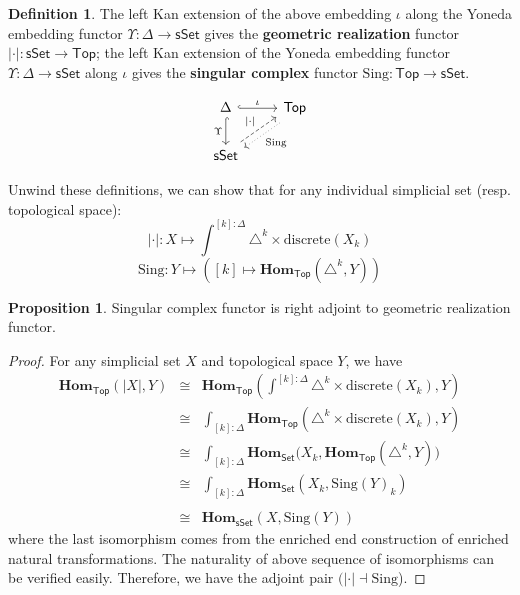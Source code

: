 \documentclass{article}
\theoremstyle{definition}
\newtheorem{mydef}{Definition}[section]
\newtheorem{prop}{Proposition}[section]
\theoremstyle{remark}
\begin{document}
\begin{mydef}

The left Kan extension of the above embedding $\iota$ along the Yoneda embedding functor $\Upsilon: \Delta \to \mathsf{sSet}$ gives the \textbf{geometric realization} functor $|\cdot|: \mathsf{sSet} \to \mathsf{Top}$; the left Kan extension of the Yoneda embedding functor $\Upsilon: \Delta \to \mathsf{sSet}$ along $\iota$ gives the \textbf{singular complex} functor $\mathrm{Sing}: \mathsf{Top} \to \mathsf{sSet}$.

$$\begin{tikzcd} \Delta \arrow[d, "\Upsilon"', hook] \arrow[r, "\iota", hook] & \mathsf{Top} \arrow[ld, "\mathrm{Sing}", dotted, shift left] \\
\mathsf{sSet} \arrow[ru, "|\cdot|", dashed, shift left]               &                                         
\end{tikzcd}$$

Unwind these definitions, we can show that for any individual simplicial set (resp. topological space): $$ |\cdot|:X \mapsto \int^{[k]:\Delta}{\triangle^k \times \mathrm{discrete}(X_k) }$$    $$ \mathrm{Sing}: Y \mapsto ([k] \mapsto \mathbf{Hom}_{\mathsf{Top}}(\triangle^k,Y))$$

\end{mydef}

\begin{prop}

Singular complex functor is right adjoint to geometric realization functor.

\end{prop}

\begin{proof}
For any simplicial set $X$ and topological space $Y$, we have 
\begin{eqnarray*} \mathbf{Hom}_{\mathsf{Top}}(|X|,Y) &\cong& \mathbf{Hom}_{\mathsf{Top}}\left(\int^{[k]:\Delta}{\triangle^k \times \mathrm{discrete}(X_k) },Y\right) \\ &\cong& \int_{[k]:\Delta}{\mathbf{Hom}_{\mathsf{Top}}( \triangle^k \times \mathrm{discrete}(X_k),Y) } \\ &\cong&  \int_{[k]:\Delta}{\mathbf{Hom}_{\mathsf{Set}}(X_k, \mathbf{Hom}_{\mathsf{Top}}(\triangle^k,Y)}) \\ &\cong& \int_{[k]:\Delta}{\mathbf{Hom}_{\mathsf{Set}}(X_k,\mathrm{Sing}(Y)_k)}\\ \\ &\cong& \mathbf{Hom}_{\mathsf{sSet}}(X,\mathrm{Sing}(Y)) \end{eqnarray*} where the last isomorphism comes from the enriched end construction of enriched natural transformations. The naturality of above sequence of isomorphisms can be verified easily. Therefore, we have the adjoint pair $(|\cdot| \dashv \mathrm{Sing}$).

\end{proof}
\end{document}

